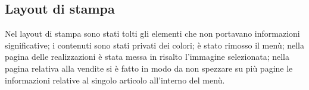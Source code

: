 {	\subsection{Layout di stampa}{
		Nel layout di stampa sono stati tolti gli elementi che non portavano informazioni significative; i contenuti sono stati privati dei colori; è stato rimosso il menù; nella pagina delle realizzazioni è stata messa in risalto l'immagine selezionata; nella pagina relativa alla vendite si è fatto in modo da non spezzare su più pagine le informazioni relative al singolo articolo all'interno del menù.
	}
}